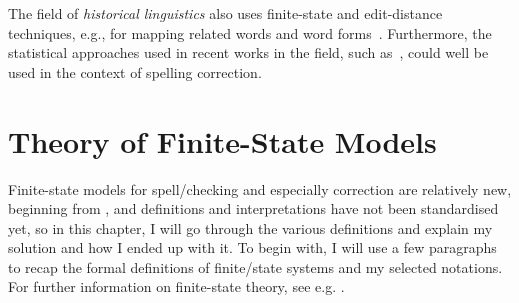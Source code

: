 \documentclass[officiallayout,final]{unihelcompling}
\begin{document}
The field of \emph{historical linguistics} also uses finite-state and
edit-distance techniques, e.g., for mapping related words and
word forms~\citep{porta2013edit}. Furthermore, the statistical approaches used
in recent works in the field, such as~\citet{petterson2013smt}, could well be
used in the context of spelling correction. 

\section{Theory of Finite-State Models}
\label{sec:finite-state-theory}

Finite-state models for spell\-/checking and especially correction are
relatively new, beginning from \citep{oflazer1996errortolerant}, and
definitions and interpretations have not been standardised yet, so in this
chapter, I will go through the various definitions and explain my solution and
how I ended up with it. To begin with, I will use a few paragraphs to recap the
formal definitions of finite\-/state systems and my selected notations. For
further information on finite-state theory, see e.g.
\citet{aho2007compilers,mohri1997finitestate}.
\end{document}
